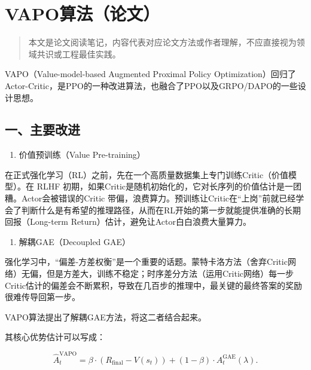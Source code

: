 \clearpage

\hypertarget{vapoux7b97ux6cd5ux8bbaux6587}{%
\section{VAPO算法（论文）}\label{vapoux7b97ux6cd5ux8bbaux6587}}

\begin{quote}
本文是论文阅读笔记，内容代表对应论文方法或作者理解，不应直接视为领域共识或工程最佳实践。
\end{quote}

VAPO（Value-model-based Augmented Proximal Policy Optimization）回归了Actor-Critic，是PPO的一种改进算法，也融合了PPO以及GRPO/DAPO的一些设计思想。

\hypertarget{ux4e00ux4e3bux8981ux6539ux8fdb}{%
\subsection{一、主要改进}\label{ux4e00ux4e3bux8981ux6539ux8fdb}}

\begin{enumerate}
\def\labelenumi{\arabic{enumi}.}
\tightlist
\item
  价值预训练（Value Pre-training）
\end{enumerate}

在正式强化学习（RL）之前，先在一个高质量数据集上专门训练Critic（价值模型）。在 RLHF 初期，如果Critic是随机初始化的，它对长序列的价值估计是一团糟。Actor会被错误的Critic 带偏，浪费算力。预训练让Critic在``上岗''前就已经学会了判断什么是有希望的推理路径，从而在RL开始的第一步就能提供准确的长期回报（Long-term Return）估计，避免让Actor白白浪费大量算力。

\begin{enumerate}
\def\labelenumi{\arabic{enumi}.}
\setcounter{enumi}{1}
\tightlist
\item
  解耦GAE（Decoupled GAE）
\end{enumerate}

强化学习中，``偏差-方差权衡''是一个重要的话题。蒙特卡洛方法（舍弃Critic网络）无偏，但是方差大，训练不稳定；时序差分方法（运用Critic网络）每一步Critic估计的偏差会不断累积，导致在几百步的推理中，最关键的最终答案的奖励很难传导回第一步。

VAPO算法提出了解耦GAE方法，将这二者结合起来。

其核心优势估计可以写成：

\[
\hat{A}_t^{\mathrm{VAPO}}
=
\beta\cdot(R_{\mathrm{final}}-V(s_t))
+
(1-\beta)\cdot A_t^{\mathrm{GAE}}(\lambda).
\]


